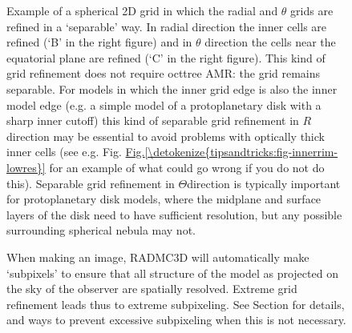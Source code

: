 \documentclass[letterpaper,10pt,english]{sphinxmanual}
\begin{document}

\begin{figure}[htbp]
\centering
\capstart

\noindent{}
\caption{Example of a spherical 2\sphinxhyphen{}D grid in which the radial and \(\theta\) grids
are refined in a ‘separable’ way. In radial direction the inner cells are
refined (‘B’ in the right figure) and in \(\theta\) direction the cells
near the equatorial plane are refined (‘C’ in the right figure). This kind of
grid refinement does not require oct\sphinxhyphen{}tree AMR: the grid remains
separable. For models in which the inner grid edge is also the inner model
edge (e.g. a simple model of a protoplanetary disk with a sharp inner
cut\sphinxhyphen{}off) this kind of separable grid refinement in \(R\)\sphinxhyphen{}direction may be
essential to avoid problems with optically thick inner cells (see e.g. Fig.
\hyperref[\detokenize{tipsandtricks:fig-innerrim-lowres}]{Fig.\@ \ref{\detokenize{tipsandtricks:fig-innerrim-lowres}}} for an example of what could go wrong if you do
not do this). Separable grid refinement in \(\Theta\)\sphinxhyphen{}direction is
typically important for protoplanetary disk models, where the midplane and
surface layers of the disk need to have sufficient resolution, but any
possible surrounding spherical nebula may not.}\label{\detokenize{gridding:id2}}\label{\detokenize{gridding:fig-spher-sep-ref-txt}}\end{figure}

\begin{figure}[htbp]
\centering
\capstart

\noindent{}
\caption{When making an image, RADMC\sphinxhyphen{}3D will automatically make ‘sub\sphinxhyphen{}pixels’ to ensure
that all structure of the model as projected on the sky of the observer are
spatially resolved.  Extreme grid refinement leads thus to extreme
sub\sphinxhyphen{}pixeling. See Section {\hyperref[\detokenize{imagesspectra:sec-rec-subpixel-spher-coord}]{}} for details,
and ways to prevent excessive sub\sphinxhyphen{}pixeling when this is not necessary.}\label{\detokenize{gridding:id3}}\label{\detokenize{gridding:fig-spher-sep-ref-rays}}\end{figure}
\end{document}
